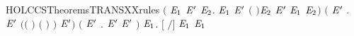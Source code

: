 \begin{SaveVerbatim}{HOLCCSTheoremsTRANSXXrules}
   \ensuremath{(}\HOLSymConst{\HOLTokenForall{}}  \ensuremath{\HOLBoundVar{E}\sb{\mathrm{1}}} \ensuremath{\HOLBoundVar{E}\sp{\prime}} \ensuremath{\HOLBoundVar{E}\sb{\mathrm{2}}}.
         \HOLTokenTransBegin{} \HOLTokenTransEnd \ensuremath{\HOLBoundVar{E}\sb{\mathrm{1}}} \HOLSymConst{\HOLTokenConj{}} \ensuremath{\HOLBoundVar{E}\sp{\prime}} \HOLTokenTransBegin{} \ensuremath{(} \ensuremath{)}\HOLTokenTransEnd \ensuremath{\HOLBoundVar{E}\sb{\mathrm{2}}} \HOLSymConst{\HOLTokenImp{}}
         \HOLSymConst{\ensuremath{\mid}} \ensuremath{\HOLBoundVar{E}\sp{\prime}} \HOLTokenTransBegin\HOLConst{\ensuremath{\tau}}\HOLTokenTransEnd \ensuremath{\HOLBoundVar{E}\sb{\mathrm{1}}} \HOLSymConst{\ensuremath{\mid}} \ensuremath{\HOLBoundVar{E}\sb{\mathrm{2}}}\ensuremath{)} \HOLSymConst{\HOLTokenConj{}}
   \ensuremath{(}\HOLSymConst{\HOLTokenForall{}}  \ensuremath{\HOLBoundVar{E}\sp{\prime}}  .
         \HOLTokenTransBegin{}\HOLTokenTransEnd \ensuremath{\HOLBoundVar{E}\sp{\prime}} \HOLSymConst{\HOLTokenConj{}}
        \ensuremath{(}\ensuremath{(} \HOLSymConst{\ensuremath{=}} \HOLConst{\ensuremath{\tau}}\ensuremath{)} \HOLSymConst{\HOLTokenDisj{}} \ensuremath{(} \HOLSymConst{\ensuremath{=}}  \ensuremath{)} \HOLSymConst{\HOLTokenConj{}}  \HOLConst{\HOLTokenNotIn{}}  \HOLSymConst{\HOLTokenConj{}}   \HOLConst{\HOLTokenNotIn{}} \ensuremath{)} \HOLSymConst{\HOLTokenImp{}}
           \HOLTokenTransBegin{}\HOLTokenTransEnd {}  \ensuremath{\HOLBoundVar{E}\sp{\prime}}\ensuremath{)} \HOLSymConst{\HOLTokenConj{}}
   \ensuremath{(}\HOLSymConst{\HOLTokenForall{}}  \ensuremath{\HOLBoundVar{E}\sp{\prime}} .  \HOLTokenTransBegin{}\HOLTokenTransEnd \ensuremath{\HOLBoundVar{E}\sp{\prime}} \HOLSymConst{\HOLTokenImp{}}    \HOLTokenTransBegin{}  \HOLTokenTransEnd {} \ensuremath{\HOLBoundVar{E}\sp{\prime}} \ensuremath{)} \HOLSymConst{\HOLTokenConj{}}
   \HOLSymConst{\HOLTokenForall{}}   \ensuremath{\HOLBoundVar{E}\sb{\mathrm{1}}}. \ensuremath{[}  \ensuremath{/}\ensuremath{]}  \HOLTokenTransBegin{}\HOLTokenTransEnd \ensuremath{\HOLBoundVar{E}\sb{\mathrm{1}}} \HOLSymConst{\HOLTokenImp{}}    \HOLTokenTransBegin{}\HOLTokenTransEnd \ensuremath{\HOLBoundVar{E}\sb{\mathrm{1}}}
\end{SaveVerbatim}
